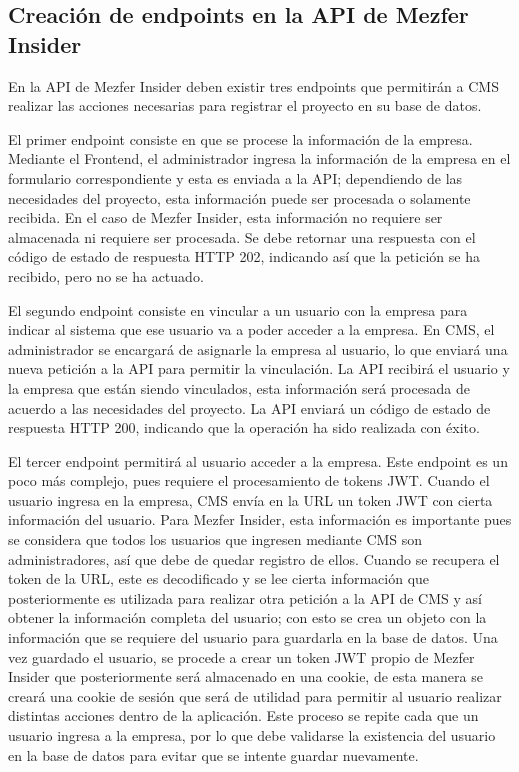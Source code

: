\subsection{Creación de endpoints en la API de Mezfer Insider}
En la API de Mezfer Insider deben existir tres endpoints que permitirán a CMS realizar las acciones necesarias para registrar el proyecto en su base de datos.

El primer endpoint consiste en que se procese la información de la empresa. Mediante el Frontend, el administrador ingresa la información de la empresa en el formulario correspondiente y esta es enviada a la API; dependiendo de las necesidades del proyecto, esta información puede ser procesada o solamente recibida. En el caso de Mezfer Insider, esta información no requiere ser almacenada ni requiere ser procesada. Se debe retornar una respuesta con el código de estado de respuesta HTTP 202, indicando así que la petición se ha recibido, pero no se ha actuado.

El segundo endpoint consiste en vincular a un usuario con la empresa para indicar al sistema que ese usuario va a poder acceder a la empresa. En CMS, el administrador se encargará de asignarle la empresa al usuario, lo que enviará una nueva petición a la API para permitir la vinculación. La API recibirá el usuario y la empresa que están siendo vinculados, esta información será procesada de acuerdo a las necesidades del proyecto. La API enviará un código de estado de respuesta HTTP 200, indicando que la operación ha sido realizada con éxito.

El tercer endpoint permitirá al usuario acceder a la empresa. Este endpoint es un poco más complejo, pues requiere el procesamiento de tokens JWT. Cuando el usuario ingresa en la empresa, CMS envía en la URL un token JWT con cierta información del usuario.
Para Mezfer Insider, esta información es importante pues se considera que todos los usuarios que ingresen mediante CMS son administradores, así que debe de quedar registro de ellos. Cuando se recupera el token de la URL, este es decodificado y se lee cierta información que posteriormente es utilizada para realizar otra petición a la API de CMS y así obtener la información completa del usuario; con esto se crea un objeto con la información que se requiere del usuario para guardarla en la base de datos. Una vez guardado el usuario, se procede a crear un token JWT propio de Mezfer Insider que posteriormente será almacenado en una cookie, de esta manera se creará una cookie de sesión que será de utilidad para permitir al usuario realizar distintas acciones dentro de la aplicación. Este proceso se repite cada que un usuario ingresa a la empresa, por lo que debe validarse la existencia del usuario en la base de datos para evitar que se intente guardar nuevamente.